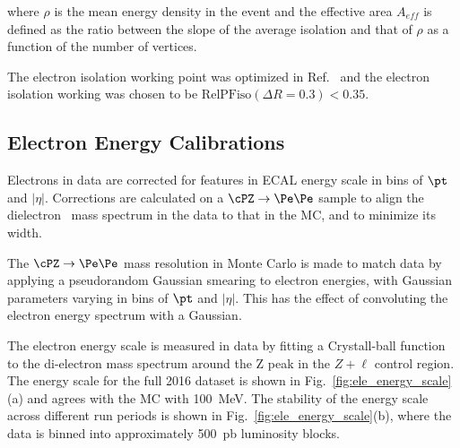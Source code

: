 where $\rho$ is the mean energy density in the event and the effective area $A_{eff}$ is defined as the ratio
between the slope of the average isolation and that of $\rho$ as a function of the number of vertices. 

The electron isolation working point was optimized in Ref.~\cite{AN-15-277} and the electron isolation working was 
chosen to be $\text{RelPFiso}(\Delta R = 0.3) < 0.35$. 


\subsection{Electron Energy Calibrations}


Electrons in data are corrected for features in ECAL energy scale
in bins of $\pt$ and $\left| \eta \right|$. Corrections are calculated
on a $\cPZ \to \Pe\Pe$ sample to align the dielectron 
mass spectrum in the data to that in the MC, and to
minimize its width.

The $\cPZ \to \Pe\Pe$ mass resolution in Monte Carlo is made to match
data by applying a pseudorandom Gaussian smearing to electron energies,
with Gaussian parameters varying in bins of $\pt$ and $\left| \eta \right|$.
This has the effect of convoluting the electron energy spectrum with a
Gaussian.

The electron energy scale is measured in data by fitting a Crystall-ball function to the di-electron mass spectrum around the Z peak in the $Z+\ell$ control region. 
The energy scale for the full 2016 dataset is shown in Fig.~\ref{fig:ele_energy_scale}(a) and agrees with the MC with 100~MeV. 
The stability of the energy scale across different run periods is shown in Fig.~\ref{fig:ele_energy_scale}(b), where the data is binned into approximately 500~pb luminosity blocks.

